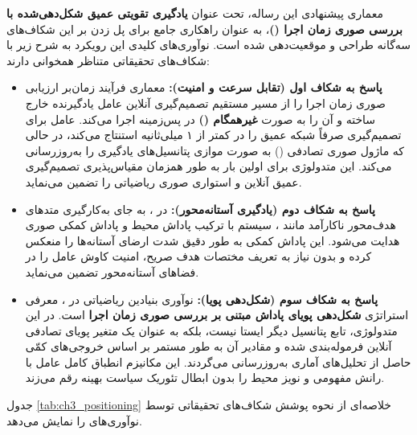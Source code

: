 \documentclass[oneside,openany,phd]{TMU-Thesis}
\begin{document}
معماری پیشنهادی این رساله، تحت عنوان \textbf{یادگیری تقویتی عمیق شکل‌دهی‌شده با بررسی صوری زمان اجرا ()}، به عنوان راهکاری جامع برای پل زدن بر این شکاف‌های سه‌گانه طراحی و موقعیت‌دهی شده است. نوآوری‌های کلیدی این رویکرد به شرح زیر با شکاف‌های تحقیقاتی متناظر همخوانی دارند:

\begin{itemize}
    \item \textbf{پاسخ به شکاف اول (تقابل سرعت و امنیت):} معماری  فرآیند زمان‌بر ارزیابی صوری زمان اجرا را از مسیر مستقیم تصمیم‌گیری آنلاین عامل یادگیرنده خارج ساخته و آن را به صورت \textbf{غیرهمگام ()} در پس‌زمینه اجرا می‌کند. عامل برای تصمیم‌گیری صرفاً شبکه عمیق را در کمتر از ۱ میلی‌ثانیه استنتاج می‌کند، در حالی که ماژول صوری تصادفی () به صورت موازی پتانسیل‌های یادگیری را به‌روزرسانی می‌کند. این متدولوژی برای اولین بار به طور همزمان مقیاس‌پذیری تصمیم‌گیری عمیق آنلاین و استواری صوری ریاضیاتی را تضمین می‌نماید.

    \item \textbf{پاسخ به شکاف دوم (یادگیری آستانه‌محور):} در ، به جای به‌کارگیری متدهای هدف‌محور ناکارآمد مانند ، سیستم با ترکیب پاداش محیط و پاداش کمکی صوری هدایت می‌شود. این پاداش کمکی به طور دقیق شدت ارضای آستانه‌ها را منعکس کرده و بدون نیاز به تعریف مختصات هدف صریح، امنیت کاوش عامل را در فضاهای آستانه‌محور تضمین می‌نماید.

    \item \textbf{پاسخ به شکاف سوم (شکل‌دهی پویا):} نوآوری بنیادین ریاضیاتی در ، معرفی استراتژی \textbf{شکل‌دهی پویای پاداش مبتنی بر بررسی صوری زمان اجرا} است. در این متدولوژی، تابع پتانسیل دیگر ایستا نیست، بلکه به عنوان یک متغیر پویای تصادفی آنلاین فرموله‌بندی شده و مقادیر آن به طور مستمر بر اساس خروجی‌های کمّی حاصل از تحلیل‌های آماری  به‌روزرسانی می‌گردند. این مکانیزم انطباق کامل عامل با رانش مفهومی و نویز محیط را بدون ابطال تئوریک سیاست بهینه رقم می‌زند.
\end{itemize}

جدول \ref{tab:ch3_positioning} خلاصه‌ای از نحوه پوشش شکاف‌های تحقیقاتی توسط نوآوری‌های  را نمایش می‌دهد.
\end{document}
